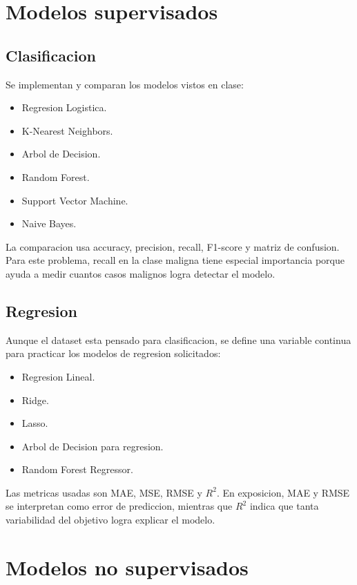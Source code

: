 \documentclass[12pt,letterpaper]{article}
\begin{document}
\section{Modelos supervisados}

\subsection{Clasificacion}

Se implementan y comparan los modelos vistos en clase:

\begin{itemize}[leftmargin=*]
    \item Regresion Logistica.
    \item K-Nearest Neighbors.
    \item Arbol de Decision.
    \item Random Forest.
    \item Support Vector Machine.
    \item Naive Bayes.
\end{itemize}

La comparacion usa accuracy, precision, recall, F1-score y matriz de confusion. Para este problema, recall en la clase maligna tiene especial importancia porque ayuda a medir cuantos casos malignos logra detectar el modelo.

\subsection{Regresion}

Aunque el dataset esta pensado para clasificacion, se define una variable continua para practicar los modelos de regresion solicitados:

\begin{itemize}[leftmargin=*]
    \item Regresion Lineal.
    \item Ridge.
    \item Lasso.
    \item Arbol de Decision para regresion.
    \item Random Forest Regressor.
\end{itemize}

Las metricas usadas son MAE, MSE, RMSE y $R^2$. En exposicion, MAE y RMSE se interpretan como error de prediccion, mientras que $R^2$ indica que tanta variabilidad del objetivo logra explicar el modelo.

\section{Modelos no supervisados}
\end{document}
